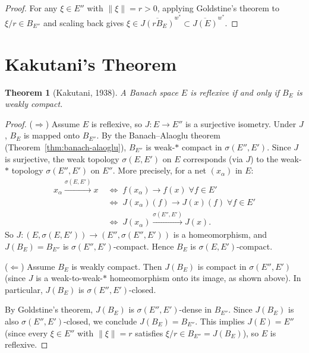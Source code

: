\documentclass[a4paper,12pt]{book}
\newcommand{\norm}[1]{\left\| #1 \right\|}
\theoremstyle{definition}
\theoremstyle{plain}
\newtheorem{theorem}[definition]{Theorem}
\theoremstyle{remark}
\begin{document}
\begin{proof}
For any $\xi\in E''$ with $\norm{\xi}=r>0$, applying Goldstine's theorem to
$\xi/r\in B_{E''}$ and scaling back gives $\xi\in\overline{J(rB_E)}^{w^*}
\subset\overline{J(E)}^{w^*}$.
\end{proof}

\section{Kakutani's Theorem}\label{sec:kakutani}

\begin{theorem}[{Kakutani, 1938}]\label{thm:kakutani}
A Banach space $E$ is reflexive if and only if $B_E$ is weakly compact.
\end{theorem}

\begin{proof}
($\Rightarrow$) Assume $E$ is reflexive, so $J:E\to E''$ is a surjective
isometry.  Under $J$, $B_E$ is mapped onto $B_{E''}$.  By the Banach--Alaoglu
theorem (Theorem~\ref{thm:banach-alaoglu}), $B_{E''}$ is weak-$*$ compact in
$\sigma(E'',E')$.  Since $J$ is surjective, the weak topology $\sigma(E,E')$
on $E$ corresponds (via $J$) to the weak-$*$ topology $\sigma(E'',E')$ on $E''$.
More precisely, for a net $(x_\alpha)$ in $E$:
\begin{align*}
  x_\alpha\xrightarrow{\sigma(E,E')} x
  &\;\Longleftrightarrow\; f(x_\alpha)\to f(x)\;\forall f\in E' \\
  &\;\Longleftrightarrow\; J(x_\alpha)(f)\to J(x)(f)\;\forall f\in E' \\
  &\;\Longleftrightarrow\; J(x_\alpha)\xrightarrow{\sigma(E'',E')} J(x).
\end{align*}
So $J:(E,\sigma(E,E'))\to(E'',\sigma(E'',E'))$ is a homeomorphism, and
$J(B_E) = B_{E''}$ is $\sigma(E'',E')$-compact.  Hence $B_E$ is
$\sigma(E,E')$-compact.

($\Leftarrow$) Assume $B_E$ is weakly compact.  Then $J(B_E)$ is compact
in $\sigma(E'',E')$ (since $J$ is a weak-to-weak-$*$ homeomorphism onto its
image, as shown above).  In particular, $J(B_E)$ is $\sigma(E'',E')$-closed.

By Goldstine's theorem, $J(B_E)$ is $\sigma(E'',E')$-dense in $B_{E''}$.
Since $J(B_E)$ is also $\sigma(E'',E')$-closed, we conclude
$J(B_E) = B_{E''}$.  This implies $J(E) = E''$ (since every $\xi\in E''$ with
$\norm{\xi}=r$ satisfies $\xi/r\in B_{E''} = J(B_E)$), so $E$ is reflexive.
\end{proof}
\end{document}
